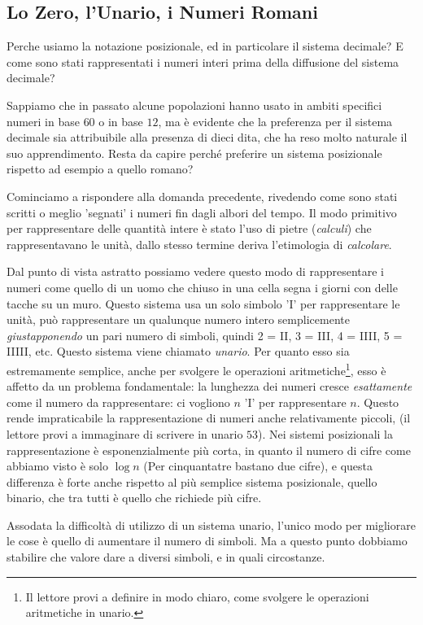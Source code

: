 \subsection*{Lo Zero, l'Unario, i Numeri Romani}
{ \small
Perche usiamo la notazione posizionale, ed in particolare il sistema decimale?
E come sono stati rappresentati i numeri interi prima della diffusione del
sistema decimale?

Sappiamo che in passato alcune popolazioni hanno usato in ambiti specifici
numeri in base $60$ o in base $12$, ma è evidente che la preferenza per il
sistema decimale sia attribuibile alla presenza di dieci dita, che ha reso
molto naturale il suo apprendimento. Resta da capire perché preferire un
sistema posizionale rispetto ad esempio a quello romano?

Cominciamo a rispondere alla domanda precedente, rivedendo come sono stati
scritti o meglio 'segnati' i numeri fin dagli albori del tempo. Il modo
primitivo per rappresentare delle quantità intere è stato l'uso di pietre
(\emph{calculi}) che rappresentavano le unità, dallo stesso termine deriva
l'etimologia di \emph{calcolare}.

Dal punto di vista astratto possiamo vedere questo modo di rappresentare i
numeri come quello di un uomo che chiuso in una cella segna i giorni con delle
tacche su un muro. Questo sistema usa un solo simbolo '\textsc{I}' per
rappresentare le unità, può rappresentare un qualunque numero intero
semplicemente \emph{giustapponendo} un pari numero di simboli, quindi 2 =
\textsc{II}, 3 = \textsc{III}, 4 = \textsc{IIII}, 5 = \textsc{IIIII}, etc.
Questo sistema viene chiamato \emph{unario}. Per quanto
esso sia estremamente semplice, anche per svolgere le operazioni
aritmetiche\footnote{Il lettore provi a definire in modo chiaro, come svolgere
le operazioni aritmetiche in unario.}, esso è affetto da un problema
fondamentale: la lunghezza dei numeri cresce \emph{esattamente} come il numero
da rappresentare: ci vogliono $n$ 'I' per rappresentare $n$. Questo rende
impraticabile la rappresentazione di numeri anche relativamente piccoli, (il
lettore provi a immaginare di scrivere in unario $53$). Nei sistemi posizionali
la rappresentazione è esponenzialmente più corta, in quanto il numero di cifre
come abbiamo visto è solo $\log n$ (Per cinquantatre bastano due cifre), e
questa differenza è forte anche rispetto al più semplice sistema posizionale,
quello binario, che tra tutti è quello che richiede più cifre.

Assodata la difficoltà di utilizzo di un sistema unario, l'unico modo per
migliorare le cose è quello di aumentare il numero di simboli. Ma a questo
punto dobbiamo stabilire che valore dare a diversi simboli, e in quali
circostanze.

}
